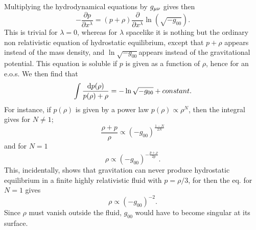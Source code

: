 Multiplying the hydrodynamical equations by $g_{\mu \nu}$ gives then
\begin{equation}
-\frac{\partial p}{\partial x^\lambda}=(p+\rho) \frac{\partial}{\partial x^\lambda} \ln(\sqrt{-g_{00}}).
\end{equation}
This is trivial for $\lambda=0$, whereas for $\lambda$ spacelike it is nothing but the ordinary non relativistic equation of hydrostatic equilibrium, except that $p+\rho$ appears instead of the mass density, and $\ln\sqrt{-g_{00}} $appears instead of the gravitational potential. This equation is soluble if $p$ is given as a function of $\rho$, hence for an e.o.s. We then find that
\begin{equation}
\int \frac{\mathrm{d} p(\rho)}{p(\rho) + \rho} = - \ln \sqrt{-g_{00}} + constant.
\end{equation}
For instance, if $p( \rho)$ is given by a power law $p(\rho) \propto \rho^N$, then the integral gives for $N\neq1$;
\begin{equation}
\frac{\rho+p}{\rho} \propto (-g_{00})^{\frac{1-N}{2N}}
\end{equation}
and for $N=1$
\begin{equation}
\rho \propto (-g_{00})^{-\frac{p+\rho}{2 p}}.
\end{equation}
This, incidentally, shows that gravitation can never produce hydrostatic equilibrium in a finite highly relativistic fluid with $p = \rho/3$, for then the eq. for $N=1$ gives
\begin{equation}
\rho \propto (-g_{00})^{-2}.
\end{equation}
Since $\rho$ must vanish outside the fluid, $g_{00}$ would have to become singular at its surface.




%
